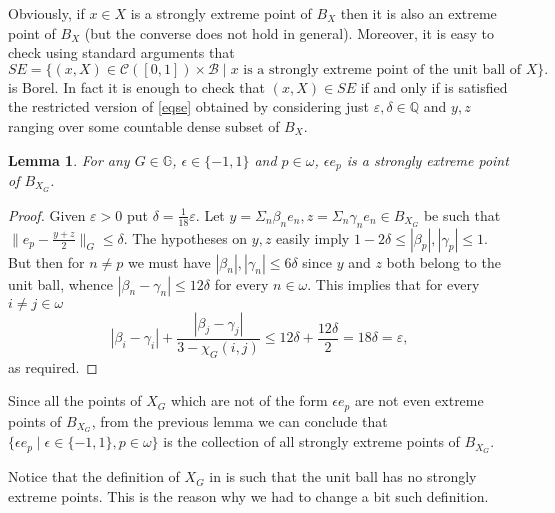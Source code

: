 \documentclass{amsart}
\newtheorem{lemma}[theorem]{Lemma}
\theoremstyle{definition}
\theoremstyle{remark}
\begin{document}
Obviously, if $x \in X$ is a strongly extreme point of $B_X$ then it is
also an extreme point of $B_X$ (but the converse does not hold in
general). Moreover, it is easy to check using standard arguments that
\[
SE =\{(x,X) \in \mathcal{C}([0,1]) \times \mathcal{B} \mid
x \text{ is a strongly extreme point of the unit ball of } X\}.
\]
is Borel. In fact it is enough to check that $(x,X) \in SE$ if and only
if is satisfied the restricted version of \eqref{eqse} obtained by
considering just $\varepsilon,\delta  \in {\mathbb{Q}}$ and $y,z$ ranging over
some countable dense subset of $B_X$.

\begin{lemma}\label{lemmase}
For any $G \in {\mathbb{G}}$, $\epsilon \in \{ -1,1\}$ and $p \in \omega$,
$\epsilon e_p$ is a strongly extreme point of  $B_{X_G}$.
\end{lemma}

\begin{proof}
Given $\varepsilon > 0$ put $\delta = \frac{1}{18} \varepsilon$. Let
$y = \Sigma_n \beta_n e_n,z = \Sigma_n \gamma_n e_n \in B_{X_G}$ be such that
$\| e_p - \frac{y+z}{2} \|_G \leq\delta $. The hypotheses on $y,z$ easily imply $1 - 2 \delta \leq
|\beta_p|, |\gamma_p| \leq 1$. But then  for $n \neq p$ we must have
$|\beta_n|,|\gamma_n| \leq 6 \delta$ since $y$ and $z$ both belong to
the unit ball, whence $|\beta_n - \gamma_n| \leq 12 \delta$ for every
$n \in \omega$. This implies that for every $i \neq j \in \omega$
\[ |\beta_i - \gamma_i| + \frac{|\beta_j - \gamma_j|}{3 - \chi_G(i,j)}
\leq 12 \delta + \frac{12 \delta}{2} =18\delta =\varepsilon ,\]
as required.
\end{proof}

Since all the points of $X_G$ which are not of the form $\epsilon
e_p$ are not even extreme points of $B_{X_G}$, from the previous lemma we can
conclude that $\{ \epsilon e_p \mid \epsilon \in \{ -1,1\}, p
\in \omega \}$ is the collection of all strongly extreme points of $B_{X_G}$.

Notice that the definition of $X_G$ in \cite{louros} is such that the unit ball has no strongly extreme points.
This is the reason why we had to change a bit such definition.
\end{document}

